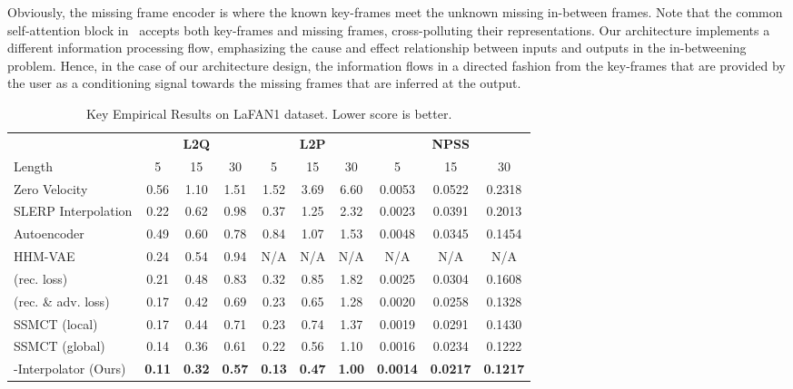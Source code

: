 \documentclass[letterpaper]{article} \usepackage[]{aaai23}  \usepackage{times}  \usepackage{helvet}  \usepackage{courier}  \usepackage[hyphens]{url}  \usepackage{graphicx} \urlstyle{rm} \def\UrlFont{\rm}  \usepackage{natbib}  \usepackage{caption} \frenchspacing  \setlength{\pdfpagewidth}{8.5in} \setlength{\pdfpageheight}{11in}
\begin{document}
Obviously, the missing frame encoder is  where the known key-frames meet the unknown missing in-between frames. Note that the common self-attention block in~\citep{duan2021singleshot} accepts both key-frames and missing frames, cross-polluting their representations. Our architecture implements a different information processing flow, emphasizing the cause and effect relationship between inputs and outputs in the in-betweening problem. Hence, in the case of our architecture design, the information flows in a directed fashion from the key-frames that are provided by the user as a conditioning signal towards the missing frames that are inferred at the output.

\begin{table*}[!ht]
\centering
\caption{Key Empirical Results on LaFAN1 dataset. Lower score is better.}
\begin{tabularx}{\textwidth}{l@{\extracolsep{\fill}} ccccccccc}
&\multicolumn{3}{c}{\textbf{L2Q}} &\multicolumn{3}{c}{\textbf{L2P}} &\multicolumn{3}{c}{\textbf{NPSS}} \\
\cmidrule(lr){2-4}\cmidrule(lr){5-7}\cmidrule(lr){8-10}
Length & 5 & 15 & 30 & 5 & 15 & 30 & 5 & 15 & 30\\
\cmidrule(lr){1-10}
Zero Velocity & 0.56 & 1.10 & 1.51 & 1.52 & 3.69 & 6.60 & 0.0053 & 0.0522 & 0.2318 \\
SLERP Interpolation & 0.22 & 0.62 & 0.98 & 0.37 & 1.25 & 2.32 & 0.0023 & 0.0391 & 0.2013 \\
\cmidrule(lr){1-10}
Autoencoder \cite{kaufmann2020} & 0.49 & 0.60 & 0.78 & 0.84 & 1.07 & 1.53 & 0.0048 & 0.0345 & 0.1454 \\
HHM-VAE \cite{li2021taskgeneric} & 0.24 & 0.54 & 0.94 & N/A & N/A & N/A & N/A & N/A & N/A \\ 
 (rec. loss) \cite{harvey2020robust} & 0.21 & 0.48 & 0.83 & 0.32 & 0.85 & 1.82 & 0.0025 & 0.0304 & 0.1608 \\
 (rec. \& adv. loss) \cite{harvey2020robust} & 0.17 & 0.42 & 0.69 & 0.23 & 0.65 & 1.28 & 0.0020 & 0.0258 & 0.1328 \\
SSMCT (local) \cite{duan2021singleshot}  & 0.17 & 0.44 & 0.71 & 0.23 & 0.74 & 1.37 & 0.0019 & 0.0291 & 0.1430\\
SSMCT (global) \cite{duan2021singleshot}  & 0.14 & 0.36 & 0.61 & 0.22 & 0.56 & 1.10 & 0.0016 & 0.0234 & 0.1222 \\
-Interpolator (Ours)  & \bf{0.11}	& \bf{0.32} &	\bf{0.57} &	\bf{0.13} &	\bf{0.47} &	\bf{1.00} &	\bf{0.0014} &	\bf{0.0217} &	\bf{0.1217} \\
\bottomrule
\end{tabularx}\label{table:key_results}
\end{table*}
\end{document}
